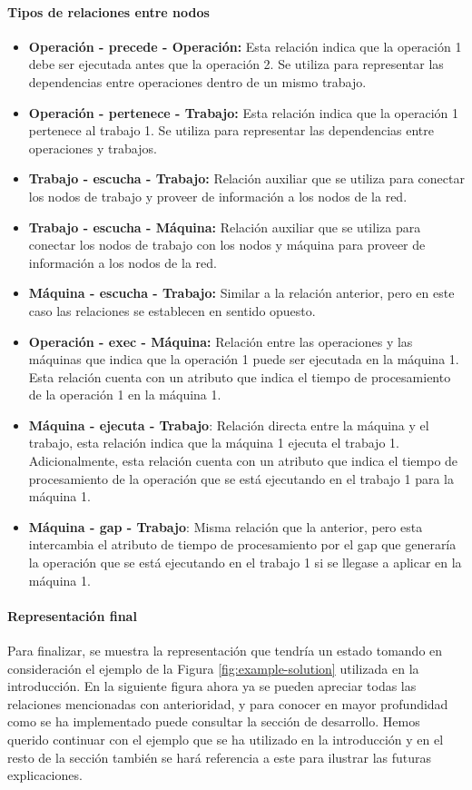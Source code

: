\paragraph{Tipos de relaciones entre nodos}
\begin{itemize}
    \item \textbf{Operación - precede - Operación:} Esta relación indica que la operación 1 debe ser
    ejecutada antes que la operación 2. Se utiliza para representar las dependencias entre operaciones
    dentro de un mismo trabajo.
    \item \textbf{Operación - pertenece - Trabajo:} Esta relación indica que la operación 1 pertenece
    al trabajo 1. Se utiliza para representar las dependencias entre operaciones y trabajos.
    \item \textbf{Trabajo - escucha - Trabajo:} Relación auxiliar que se utiliza para conectar los
    nodos de trabajo y proveer de información a los nodos de la red.
    \item \textbf{Trabajo - escucha - Máquina:} Relación auxiliar que se utiliza para conectar los
    nodos de trabajo con los nodos y máquina para proveer de información a los nodos de la red.
    \item \textbf{Máquina - escucha - Trabajo:} Similar a la relación anterior, pero en este caso
    las relaciones se establecen en sentido opuesto.
    \item \textbf{Operación - exec - Máquina:} Relación entre las operaciones y las máquinas que indica
    que la operación 1 puede ser ejecutada en la máquina 1. Esta relación cuenta con un atributo que
    indica el tiempo de procesamiento de la operación 1 en la máquina 1.
    \item \textbf{Máquina - ejecuta - Trabajo}: Relación directa entre la máquina y el trabajo, esta
    relación indica que la máquina 1 ejecuta el trabajo 1. Adicionalmente, esta relación cuenta con
    un atributo que indica el tiempo de procesamiento de la operación que se está ejecutando en el
    trabajo 1 para la máquina 1.
    \item \textbf{Máquina - gap - Trabajo}: Misma relación que la anterior, pero esta intercambia el
    atributo de tiempo de procesamiento por el gap que generaría la operación que se está ejecutando
    en el trabajo 1 si se llegase a aplicar en la máquina 1.
\end{itemize}

\paragraph{Representación final}
Para finalizar, se muestra la representación que tendría un estado tomando en consideración el ejemplo 
de la Figura \ref{fig:example-solution} utilizada en la introducción. En la siguiente figura ahora ya 
se pueden apreciar todas las relaciones mencionadas con anterioridad, y para conocer en mayor profundidad
como se ha implementado puede consultar la sección de desarrollo. Hemos querido continuar con el ejemplo
que se ha utilizado en la introducción y en el resto de la sección también se hará referencia a este
para ilustrar las futuras explicaciones. 

